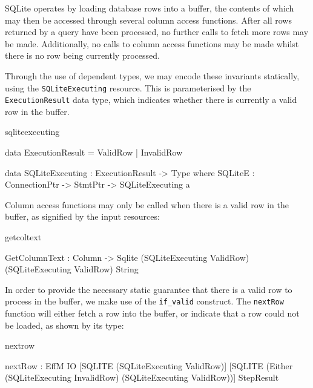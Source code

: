 SQLite operates by loading database rows into a buffer, the contents of which may then be accessed through several column access functions. After all rows returned by a query have been processed, no further calls to fetch more rows may be made. Additionally, no calls to column access functions may be made whilst there is no row being currently processed. 

Through the use of dependent types, we may encode these invariants statically, using the \texttt{SQLiteExecuting} resource. This is parameterised by the \texttt{ExecutionResult} data type, which indicates whether there is currently a valid row in the buffer.

\begin{SaveVerbatim}{sqliteexecuting}

data ExecutionResult = ValidRow
                     | InvalidRow

data SQLiteExecuting : ExecutionResult -> Type where
  SQLiteE : ConnectionPtr -> 
            StmtPtr -> SQLiteExecuting a
  
\end{SaveVerbatim}
\noindent
Column access functions may only be called when there is a valid row in the
buffer, as signified by the input resources:

\begin{SaveVerbatim}{getcoltext}

GetColumnText : Column -> 
                Sqlite (SQLiteExecuting ValidRow) 
                       (SQLiteExecuting ValidRow)
                       String
                         
\end{SaveVerbatim}

\noindent
In order to provide the necessary static guarantee that there is a valid row to
process in the buffer, we make use of the \texttt{if\_valid} construct. The
\texttt{nextRow} function will either fetch a row into the buffer, or indicate
that a row could not be loaded, as shown by its type:

\noindent
\begin{SaveVerbatim}{nextrow}

nextRow : EffM IO [SQLITE (SQLiteExecuting ValidRow)] 
         [SQLITE (Either (SQLiteExecuting InvalidRow)
                 (SQLiteExecuting ValidRow))] StepResult

\end{SaveVerbatim}

